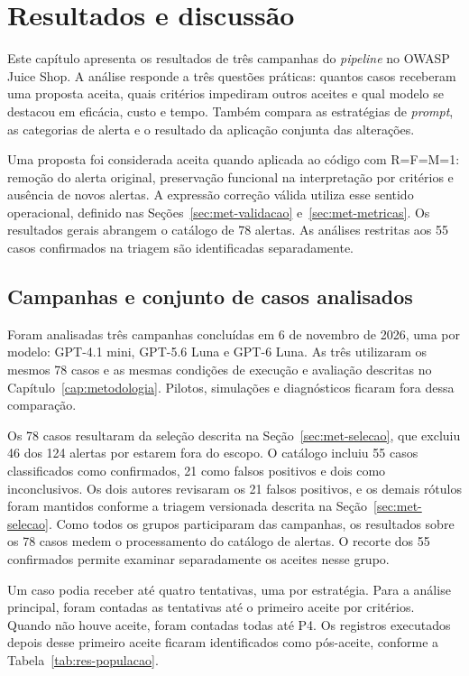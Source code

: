 \chapter[Resultados e discussão]{Resultados e discussão}
\label{cap:resultados}

Este capítulo apresenta os resultados de três campanhas do \textit{pipeline} no OWASP Juice Shop. A análise responde a três questões práticas: quantos casos receberam uma proposta aceita, quais critérios impediram outros aceites e qual modelo se destacou em eficácia, custo e tempo. Também compara as estratégias de \textit{prompt}, as categorias de alerta e o resultado da aplicação conjunta das alterações.

Uma proposta foi considerada aceita quando aplicada ao código com R=F=M=1: remoção do alerta original, preservação funcional na interpretação por critérios e ausência de novos alertas. A expressão correção válida utiliza esse sentido operacional, definido nas Seções~\ref{sec:met-validacao} e~\ref{sec:met-metricas}. Os resultados gerais abrangem o catálogo de 78 alertas. As análises restritas aos 55 casos confirmados na triagem são identificadas separadamente.

\section{Campanhas e conjunto de casos analisados}
\label{sec:res-campanhas}

Foram analisadas três campanhas concluídas em 6 de novembro de 2026, uma por modelo: GPT-4.1 mini, GPT-5.6 Luna e GPT-6 Luna. As três utilizaram os mesmos 78 casos e as mesmas condições de execução e avaliação descritas no Capítulo~\ref{cap:metodologia}. Pilotos, simulações e diagnósticos ficaram fora dessa comparação.

Os 78 casos resultaram da seleção descrita na Seção~\ref{sec:met-selecao}, que excluiu 46 dos 124 alertas por estarem fora do escopo. O catálogo incluiu 55 casos classificados como confirmados, 21 como falsos positivos e dois como inconclusivos. Os dois autores revisaram os 21 falsos positivos, e os demais rótulos foram mantidos conforme a triagem versionada descrita na Seção~\ref{sec:met-selecao}. Como todos os grupos participaram das campanhas, os resultados sobre os 78 casos medem o processamento do catálogo de alertas. O recorte dos 55 confirmados permite examinar separadamente os aceites nesse grupo.

Um caso podia receber até quatro tentativas, uma por estratégia. Para a análise principal, foram contadas as tentativas até o primeiro aceite por critérios. Quando não houve aceite, foram contadas todas até P4. Os registros executados depois desse primeiro aceite ficaram identificados como pós-aceite, conforme a Tabela~\ref{tab:res-populacao}.

